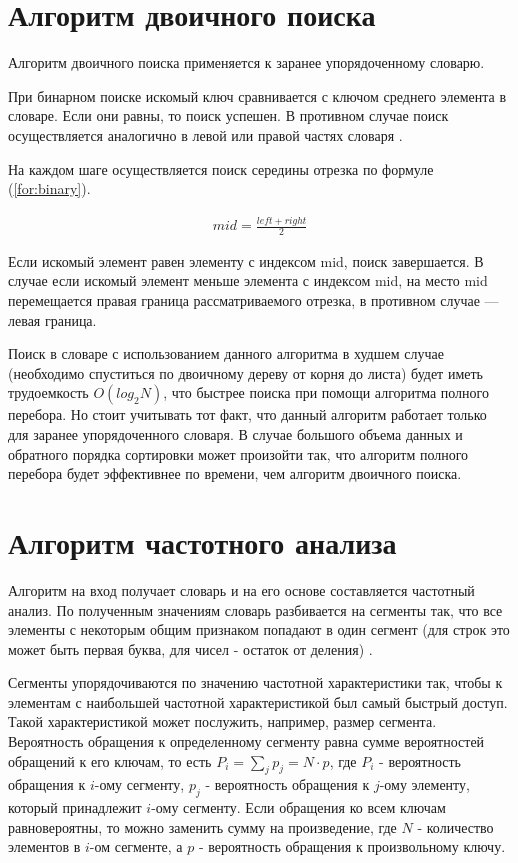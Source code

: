 \documentclass[12pt]{report}
\begin{document}
\section{Алгоритм двоичного поиска}

Алгоритм двоичного поиска применяется к заранее упорядоченному словарю. 

При бинарном поиске искомый ключ сравнивается с ключом среднего элемента в словаре. Если они равны, то поиск успешен. В противном случае поиск осуществляется аналогично в левой или правой частях словаря \cite{binary}.

На каждом шаге осуществляется поиск середины отрезка по формуле (\ref{for:binary}).

\begin{equation}
	\label{for:binary}
	\begin{aligned}
		mid = \frac{left + right}{2}
	\end{aligned}
\end{equation}

Если искомый элемент равен элементу с индексом mid, поиск завершается.
В случае если искомый элемент меньше элемента с индексом mid, на место mid перемещается правая граница рассматриваемого отрезка, в противном случае — левая граница.

Поиск в словаре с использованием данного алгоритма в худшем случае (необходимо спуститься по двоичному дереву от корня до листа) будет иметь трудоемкость $O(log_2 N)$, что быстрее поиска при помощи
алгоритма полного перебора. Но стоит учитывать тот факт, что данный
алгоритм работает только для заранее упорядоченного словаря. В случае
большого объема данных и обратного порядка сортировки может произойти так, что алгоритм полного перебора будет эффективнее по времени, чем
алгоритм двоичного поиска.


\section{Алгоритм частотного анализа}

Алгоритм на вход получает словарь и на его основе составляется частотный анализ. По полученным значениям словарь разбивается на сегменты так, что все элементы с некоторым общим признаком попадают в один сегмент (для строк это может быть первая буква, для чисел - остаток от деления) \cite{combi}. 

Сегменты упорядочиваются по значению частотной характеристики так, чтобы к элементам с наибольшей частотной характеристикой был самый быстрый доступ. Такой характеристикой может послужить, например, размер сегмента. Вероятность обращения к определенному сегменту равна сумме вероятностей обращений к его ключам, то есть $P_i = \sum_{j}p_j = N \cdot p$, где $P_i$ - вероятность обращения к $i$-ому сегменту, $p_j$ - вероятность обращения к $j$-ому элементу, который принадлежит $i$-ому сегменту. Если обращения ко всем ключам равновероятны, то можно заменить сумму на произведение, где $N$ - количество элементов в $i$-ом сегменте, а $p$ - вероятность обращения к произвольному ключу.
\end{document}
